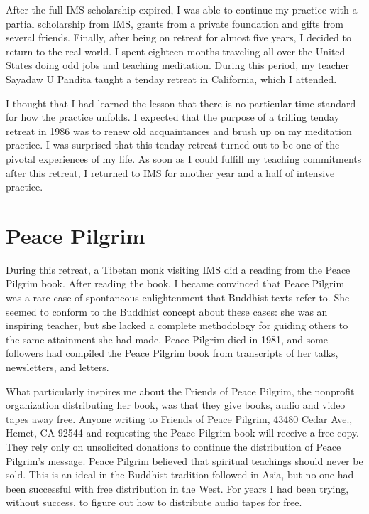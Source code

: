 \documentclass[a5paper,10pt,english]{book}
\begin{document}
\sphinxAtStartPar
After the full IMS scholarship expired, I was able to continue my
practice with a partial scholarship from IMS, grants from a private
foundation and gifts from several friends. Finally, after being on
retreat for almost five years, I decided to return to the real world. I
spent eighteen months traveling all over the United States doing odd
jobs and teaching meditation. During this period, my teacher Sayadaw U
Pandita taught a ten\sphinxhyphen{}day retreat in California, which I attended.

\sphinxAtStartPar
I thought that I had learned the lesson that there is no particular time
standard for how the practice unfolds. I expected that the purpose of a
trifling ten\sphinxhyphen{}day retreat in 1986 was to renew old acquaintances and
brush up on my meditation practice. I was surprised that this ten\sphinxhyphen{}day
retreat turned out to be one of the pivotal experiences of my life. As
soon as I could fulfill my teaching commitments after this retreat, I
returned to IMS for another year and a half of intensive practice.


\section{Peace Pilgrim}
\label{\detokenize{preface:peace-pilgrim}}
\sphinxAtStartPar
During this retreat, a Tibetan monk visiting IMS did a reading from the
Peace Pilgrim book. After reading the book, I became convinced that
Peace Pilgrim was a rare case of spontaneous enlightenment that Buddhist
texts refer to. She seemed to conform to the Buddhist concept about
these cases: she was an inspiring teacher, but she lacked a complete
methodology for guiding others to the same attainment she had made.
Peace Pilgrim died in 1981, and some followers had compiled the Peace
Pilgrim book from transcripts of her talks, newsletters, and letters.

\sphinxAtStartPar
What particularly inspires me about the Friends of Peace Pilgrim, the
nonprofit organization distributing her book, was that they give books,
audio and video tapes away free. Anyone writing to Friends of Peace
Pilgrim, 43480 Cedar Ave., Hemet, CA 92544 and requesting the Peace
Pilgrim book will receive a free copy. They rely only on unsolicited
donations to continue the distribution of Peace Pilgrim’s message. Peace
Pilgrim believed that spiritual teachings should never be sold. This is
an ideal in the Buddhist tradition followed in Asia, but no one had been
successful with free distribution in the West. For years I had been
trying, without success, to figure out how to distribute audio tapes for
free.
\end{document}
